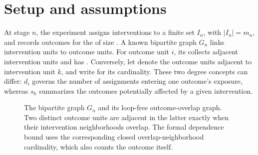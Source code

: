 \section{Setup and assumptions}\label{sec:setup-and-assumptions}

At stage \(n\), the experiment assigns interventions to a finite set \(I_n\), with \(\lvert I_n\rvert=m_n\), and records outcomes for the  of size . A known bipartite graph \(G_n\) links intervention units to outcome units. For outcome unit \(i\), its  collects adjacent intervention units and has . Conversely, let  denote the outcome units adjacent to intervention unit \(k\), and write  for its cardinality. These two degree concepts can differ: \(d_i\) governs the number of assignments entering one outcome's exposure, whereas \(s_k\) summarizes the outcomes potentially affected by a given intervention.

\begin{figure}[t]
\centering
{}
\caption{The bipartite graph \(G_n\) and its loop-free outcome-overlap graph. Two distinct outcome units are adjacent in the latter exactly when their intervention neighborhoods overlap. The formal dependence bound uses the corresponding closed overlap-neighborhood cardinality, which also counts the outcome itself.}
\end{figure}

